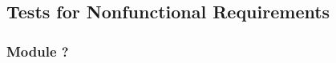 \documentclass[12pt, titlepage]{article}
\begin{document}
					
					
					



    



\subsection{Tests for Nonfunctional Requirements}



\subsubsection{Module ?}
		


					
					
					
					
					
\end{document}
